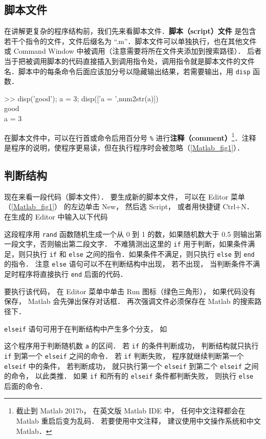 

\subsection{脚本文件}
在讲解更复杂的程序结构前，我们先来看脚本文件．\textbf{脚本（script）文件} 是包含若干个指令的文件，文件后缀名为 “.m”．脚本文件可以单独执行，也在其他文件或 Command Window 中被调用（注意需要将所在文件夹添加到搜索路径）． 后者当于把被调用脚本的代码直接插入到调用指令处，调用指令就是脚本文件的文件名．脚本中的每条命令后面应该加分号以隐藏输出结果，若需要输出，用 \texttt{disp} 函数．
\begin{Command}
>> disp('good'); a = 3; disp(['a = ',num2str(a)]) \\
good \\
a = 3
\end{Command}
在脚本文件中，可以在行首或命令后用百分号 \texttt{\%} 进行\textbf{注释（comment）}\footnote{截止到 Matlab 2017b， 在英文版 Matlab IDE 中， 任何中文注释都会在 Matlab 重启后变为乱码． 若要使用中文注释， 建议使用中文操作系统和中文 Matlab．}．注释是程序的说明，使程序更易读，但在执行程序时会被忽略（\autoref{Matlab_fig1}）．

\subsection{判断结构}
现在来看一段代码（脚本文件）． 要生成新的脚本文件， 可以在 Editor 菜单（\autoref{Matlab_fig1}） 的左边单击 New， 然后选 Script， 或者用快捷键 Ctrl+N． 在生成的 Editor 中输入以下代码

这段程序用 \texttt{rand} 函数随机生成一个从 0 到 1 的数，如果随机数大于 0.5 则输出第一段文字，否则输出第二段文字． 不难猜测出这里的 \texttt{if} 用于判断，如果条件满足，则只执行 \texttt{if} 和 \texttt{else} 之间的指令．如果条件不满足，则只执行 \texttt{else} 到 \texttt{end} 的指令． 注意 \texttt{else} 语句可以不在判断结构中出现， 若不出现， 当判断条件不满足时程序将直接执行 \texttt{end} 后面的代码．

要执行该代码， 在 Editor 菜单中单击 Run 图标（绿色三角形）， 如果代码没有保存， Matlab 会先弹出保存对话框． 再次强调文件必须保存在 Matlab 的搜索路径下．

\texttt{elseif} 语句可用于在判断结构中产生多个分支， 如

这个程序用于判断随机数 \texttt{a} 的区间． 若 \texttt{if} 的条件判断成功， 判断结构就只执行 \texttt{if} 到第一个 \texttt{elseif} 之间的命令． 若 \texttt{if} 判断失败， 程序就继续判断第一个 \texttt{elseif} 中的条件， 若判断成功， 就只执行第一个 \texttt{elseif} 到第二个 \texttt{elseif} 之间的命令， 以此类推． 如果 \texttt{if} 和所有的 \texttt{elseif} 条件都判断失败， 则执行 \texttt{else} 后面的命令．

